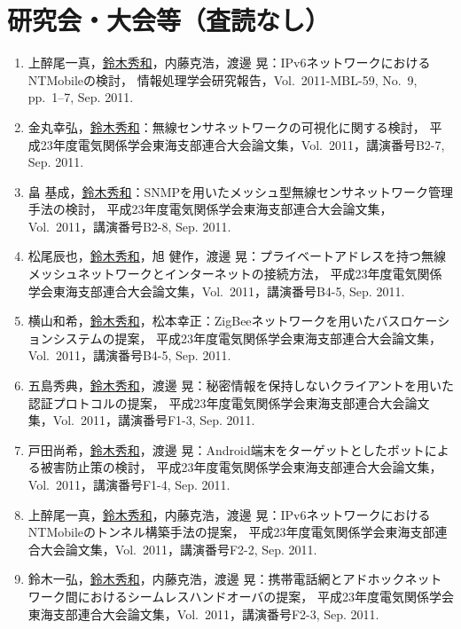 \section*{研究会・大会等（査読なし）}
\begin{enumerate}
\item 上醉尾一真，\underline{鈴木秀和}，内藤克浩，渡邊 晃：IPv6ネットワークにおけるNTMobileの検討，
情報処理学会研究報告，Vol.~2011-MBL-59, No.~9, pp.\ 1--7, Sep. 2011.

\item 金丸幸弘，\underline{鈴木秀和}：無線センサネットワークの可視化に関する検討，
平成23年度電気関係学会東海支部連合大会論文集，Vol.~2011，講演番号B2-7, Sep. 2011.

\item 畠 基成，\underline{鈴木秀和}：SNMPを用いたメッシュ型無線センサネットワーク管理手法の検討，
平成23年度電気関係学会東海支部連合大会論文集，Vol.~2011，講演番号B2-8, Sep. 2011.

\item 松尾辰也，\underline{鈴木秀和}，旭 健作，渡邊 晃：プライベートアドレスを持つ無線メッシュネットワークとインターネットの接続方法，
平成23年度電気関係学会東海支部連合大会論文集，Vol.~2011，講演番号B4-5, Sep. 2011.

\item 横山和希，\underline{鈴木秀和}，松本幸正：ZigBeeネットワークを用いたバスロケーションシステムの提案，
平成23年度電気関係学会東海支部連合大会論文集，Vol.~2011，講演番号B4-5, Sep. 2011.

\item 五島秀典，\underline{鈴木秀和}，渡邊 晃：秘密情報を保持しないクライアントを用いた認証プロトコルの提案，
平成23年度電気関係学会東海支部連合大会論文集，Vol.~2011，講演番号F1-3, Sep. 2011.

\item 戸田尚希，\underline{鈴木秀和}，渡邊 晃：Android端末をターゲットとしたボットによる被害防止策の検討，
平成23年度電気関係学会東海支部連合大会論文集，Vol.~2011，講演番号F1-4, Sep. 2011.

\item 上醉尾一真，\underline{鈴木秀和}，内藤克浩，渡邊 晃：IPv6ネットワークにおけるNTMobileのトンネル構築手法の提案，
平成23年度電気関係学会東海支部連合大会論文集，Vol.~2011，講演番号F2-2, Sep. 2011.

\item 鈴木一弘，\underline{鈴木秀和}，内藤克浩，渡邊 晃：携帯電話網とアドホックネットワーク間におけるシームレスハンドオーバの提案，
平成23年度電気関係学会東海支部連合大会論文集，Vol.~2011，講演番号F2-3, Sep. 2011.


\end{enumerate}
